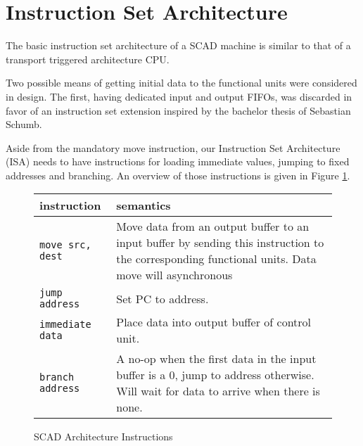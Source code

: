 	\section{Instruction Set Architecture}
		The basic instruction set architecture of a SCAD machine is similar to that of a transport triggered architecture CPU.
		
		Two possible means of getting initial data to the functional units were considered in design.
		The first, having dedicated input and output FIFOs, was discarded in favor of an instruction set extension inspired by the bachelor thesis of Sebastian Schumb\cite{Schu15}.
		
		Aside from the mandatory move instruction, our Instruction Set Architecture (ISA) needs to have instructions for loading immediate values, jumping to fixed addresses and branching.
		An overview of those instructions is given in Figure \ref{fig:instruction_table}.
		
		\begin{figure}[!ht]
			\begin{center}
				\begin{tabular}{| l | p{8cm} |}
					\hline
					\textbf{instruction} & \textbf{semantics} \\ \hline
					\lstinline{move src, dest} & Move data from an output buffer to an input buffer by sending this instruction to the corresponding functional units. Data move will asynchronous \\ \hline
					\lstinline{jump address} & Set PC to address. \\ \hline
					\lstinline{immediate data} & Place data into output buffer of control unit. \\ \hline
					\lstinline{branch address} & A no-op when the first data in the input buffer is a 0, jump to address otherwise. Will wait for data to arrive when there is none. \\ \hline
				\end{tabular}
				\label{fig:instruction_table}
				\caption{SCAD Architecture Instructions}
			\end{center}
		\end{figure}

